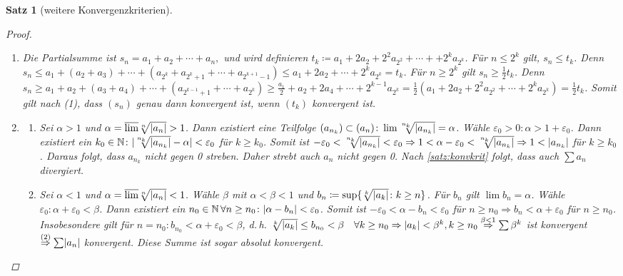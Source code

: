\documentclass[ngerman,titlepage,twoside, parskip=half*]{scrreprt}
\newcommand*{\N}{\mathbb{N}}
\theoremstyle{break}
\newtheorem{theorem}{Satz}[section]
\theoremstyle{nonumberbreak}
\newtheorem{proof}{Beweis:}
\DeclarePairedDelimiter{\abs}{\lvert}{\rvert}
\begin{document}
\begin{theorem}[weitere Konvergenzkriterien]
\begin{proof}
\begin{enumerate}[(1)]
\begin{enumerate}[({2}.1)]
	konvergent ist.
      \end{enumerate}
     \item Die Partialsumme ist $s_n = a_1+a_2+\dotsb +a_n,
     $ und wird definieren $t_k\coloneqq a_1+2a_2+2^2a_{2^2}+\dotsb+
      +2^ka_{2^k}$.  Für $n\leq 2^k$ gilt, $s_n\leq t_k$. Denn $s_n\leq
      a_1+(a_2+a_3)+\dotsb +(a_{2^k}+a_{2^k+1}+\dotsb +a_{2^{k+1}-1})\leq
      a_1+2a_2+\dotsb +2^ka_{2^k}=t_k$. Für $n\geq 2^k$ gilt $s_n\geq
      \frac{1}{2}t_k$. Denn $s_n\geq a_1 + a_2+(a_3+a_4)+\dotsb
      +(a_{2^{k-1}+1}+\dotsb +a_{2^k})\geq \frac{a_1}{2}+a_2+2a_4+\dotsb
      +2^{k-1} a_{2^k}=\frac{1}{2}(a_1+2a_2+2^2a_{2^2}+\dotsb +2^ka_{2^k})=
      \frac{1}{2} t_k$. Somit gilt nach (1), dass $(s_n)$ genau dann
      konvergent ist, wenn $(t_k)$ konvergent ist.
     \item
      \begin{enumerate}[1.\,F{a}ll]
      \item Sei $\alpha >1$ und $\alpha=\overline{\lim}\sqrt[n]{\abs{a_n}}>1$.
	Dann existiert eine Teilfolge $(a_{n_k}) \subset (a_n)\colon
        \lim \sqrt[\uproot{3}n_k]{\abs{a_{n_k}}}=\alpha$. Wähle
	$\varepsilon_0>0\colon\alpha >1+\varepsilon_0$. Dann existiert ein
	$k_0 \in \N \colon \abs{\sqrt[\uproot{3}n_k]{\abs{a_{n_k}}}
	-\alpha}<\varepsilon_0$ für $k\geq k_0$. Somit ist $-\varepsilon_0
	<\sqrt[\uproot{3}n_k]{\abs{a_{n_k}}}< \varepsilon_0 \Rightarrow
	1<\alpha-\varepsilon_0<\sqrt[\uproot{3}n_k]{\abs{a_{n_k}}}\Rightarrow
	1<\abs{a_{n_k}}$ für $k\geq k_0$.
	Daraus folgt, dass $a_{n_k}$ nicht gegen 0 streben. Daher strebt auch
	$a_n$ nicht gegen 0. Nach \autoref{satz:konvkrit}
	folgt, dass auch $\sum a_n$ divergiert.
      \item Sei $\alpha<1$ und $\alpha =\overline{\lim}\sqrt[n]{\abs{a_n}}<1$.
	Wähle $\beta$ mit $\alpha<\beta <1$ und
	$b_n\coloneqq\sup\{\sqrt[k]{\abs{a_k}}\colon k\geq n\}$.
        Für $b_n$ gilt $\lim b_n=\alpha$. Wähle
      $\varepsilon_0\colon\alpha+\varepsilon_0<\beta$. Dann existiert ein $n_0
      \in \N\,\forall n\geq n_0\colon\abs{\alpha -b_n}<\varepsilon_0$. Somit ist $-\varepsilon_0<\alpha -b_n<\varepsilon_0$ für $n\geq n_0
	\Rightarrow b_n<\alpha +\varepsilon_0$ für $n\geq n_0$. Insobesondere gilt für $n=n_0\colon b_{n_0}<\alpha +\varepsilon_0<
	\beta$, d.\,h. $\sqrt[k]{\abs{a_k}}\leq b_{n_0}<\beta \quad \forall k\geq n_0 \Rightarrow \abs{a_k}<\beta^k, k\geq n_0
	\stackrel{\beta <1}{\Rightarrow} \sum \beta^k$ ist konvergent $\stackrel{(2)}{\Rightarrow} \sum \abs{a_n}$ konvergent.
	Diese Summe ist sogar absolut konvergent.
    \end{enumerate}

\end{enumerate}
\end{proof}
\end{theorem}
\end{document}
